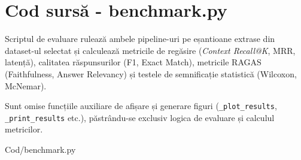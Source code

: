 \chapter{Cod sursă - benchmark.py}
\label{anexa:benchmark}

Scriptul de evaluare rulează ambele pipeline-uri pe eșantioane extrase
din dataset-ul selectat și calculează metricile de regăsire
(\textit{Context Recall@K}, MRR, latență), calitatea răspunsurilor
(F1, Exact Match), metricile RAGAS (Faithfulness, Answer Relevancy)
și testele de semnificație statistică (Wilcoxon, McNemar).

Sunt omise funcțiile auxiliare de afișare și generare figuri
(\texttt{\_plot\_results}, \texttt{\_print\_results} etc.), păstrându-se
exclusiv logica de evaluare și calculul metricilor.


  {Cod/benchmark.py}
